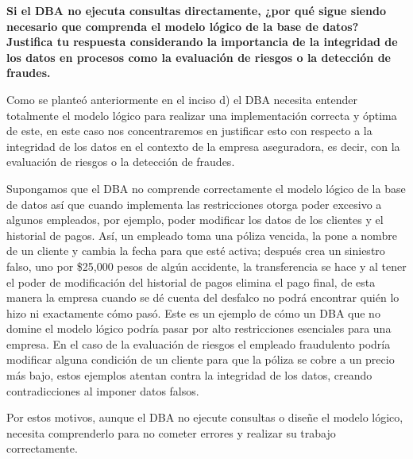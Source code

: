 \textbf{Si el DBA no ejecuta consultas directamente, ¿por qué sigue siendo necesario que comprenda el modelo lógico de la base de datos? Justifica tu respuesta considerando la importancia de la integridad de los datos en procesos como la evaluación de riesgos o la detección de fraudes.}

Como se planteó anteriormente en el inciso d) el DBA necesita entender totalmente el modelo lógico para realizar una implementación correcta y óptima de este, en este caso nos concentraremos en justificar esto con respecto a la integridad de los datos en el contexto de la empresa aseguradora, es decir, con la evaluación de riesgos o la detección de fraudes.

Supongamos que el DBA no comprende correctamente el modelo lógico de la base de datos así que cuando implementa las restricciones otorga poder excesivo a algunos empleados, por ejemplo, poder modificar los datos de los clientes y el historial de pagos. Así, un empleado toma una póliza vencida, la pone a nombre de un cliente y cambia la fecha para que esté activa; después crea un siniestro falso, uno por \$25,000 pesos de algún accidente, la transferencia se hace y al tener el poder de modificación del historial de pagos elimina el pago final, de esta manera la empresa cuando se dé cuenta del desfalco no podrá encontrar quién lo hizo ni exactamente cómo pasó. Este es un ejemplo de cómo un DBA que no domine el modelo lógico podría pasar por alto restricciones esenciales para una empresa. En el caso de la evaluación de riesgos el empleado fraudulento podría modificar alguna condición de un cliente para que la póliza se cobre a un precio más bajo, estos ejemplos atentan contra la integridad de los datos, creando contradicciones al imponer datos falsos.

Por estos motivos, aunque el DBA no ejecute consultas o diseñe el modelo lógico, necesita comprenderlo para no cometer errores y realizar su trabajo correctamente.

